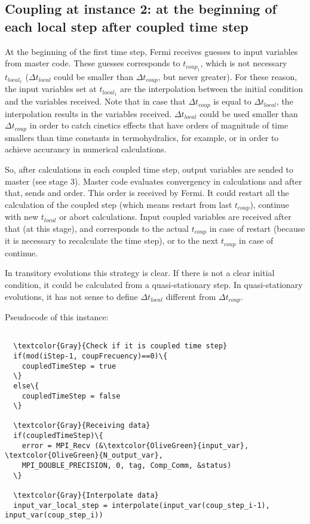 \subsection*{Coupling at instance 2: at the beginning of each local step after coupled time step}

At the beginning of the first time step, Fermi receives guesses to input variables from master code.
These guesses corresponds to $t_{coup_1}$, which is not necessary $t_{local_1}$ 
($\Delta t_{local}$ could be smaller than $\Delta t_{coup}$, but never greater).
For these reason, the input variables set at $t_{local_1}$ are the interpolation between the initial condition and the variables received.
Note that in case that $\Delta t_{coup}$ is equal to $\Delta t_{local}$, the interpolation results in the variables received.
$\Delta t_{local}$ could be used smaller than $\Delta t_{coup}$ 
in order to catch cinetics effects that have orders of magnitude of time smallers than time constants in termohydralics, for example,
or in order to achieve accurancy in numerical calculations.

So, after calculations in each coupled time step, output variables are sended to master (see stage 3).
Master code evaluates convergency in calculations and after that, sends and order.
This order is received by Fermi.
It could restart all the calculation of the coupled step (which means restart from last $t_{coup}$), 
continue with new $t_{local}$ or abort calculations.
Input coupled variables are received after that (at this stage), 
and corresponds to the actual $t_{coup}$ in case of restart (because it is necessary to recalculate the time step),
or to the next $t_{coup}$ in case of continue.

In transitory evolutions this strategy is clear.
If there is not a clear initial condition, it could be calculated from a quasi-stationary step.
In quasi-stationary evolutions, it has not sense to define $\Delta t_{local}$ different from $\Delta t_{coup}$.

Pseudocode of this instance:

\begin{Verbatim}[frame=single,commandchars=\\\{\}]

  \textcolor{Gray}{Check if it is coupled time step}
  if(mod(iStep-1, coupFrecuency)==0)\{
    coupledTimeStep = true
  \}
  else\{
    coupledTimeStep = false
  \}

  \textcolor{Gray}{Receiving data}
  if(coupledTimeStep)\{
    error = MPI_Recv (&\textcolor{OliveGreen}{input_var}, \textcolor{OliveGreen}{N_output_var},
    MPI_DOUBLE_PRECISION, 0, tag, Comp_Comm, &status)
  \}
  
  \textcolor{Gray}{Interpolate data}
  input_var_local_step = interpolate(input_var(coup_step_i-1), input_var(coup_step_i))

\end{Verbatim}


